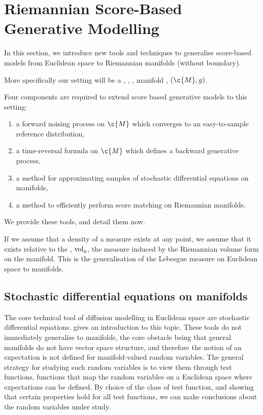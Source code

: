 \section{Riemannian Score-Based Generative Modelling}
\label{sec:score-appr-manif}
In this section, we introduce new tools and techniques to generalise score-based models from Euclidean space to Riemannian manifolds (without boundary).

More specifically our setting will be a , , ,  manifold , \((\c{M}, g)\).

Four components are required to extend score based generative models to this setting: \begin{enumerate}[label=\roman*)] \item a forward {noising} process on \(\c{M}\) which converges to an easy-to-sample reference distribution, \item a time-reversal formula on \(\c{M}\) which defines a backward generative process, \item a method for approximating samples of stochastic differential equations on manifolds, \item a method to efficiently perform score matching on Riemannian manifolds.
\end{enumerate}
We provide these tools, and detail them now.

If we assume that a density of a measure exists at any point, we assume that it exists relative to the , \(\operatorname{vol}_g\), the measure induced by the Riemannian volume form on the manifold.
This is the generalisation of the Lebesgue measure on Euclidean space to manifolds.

\subsection{Stochastic differential equations on manifolds}

The core technical tool of diffusion modelling in Euclidean space are stochastic differential equations.
 gives an introduction to this topic.
These tools do not immediately generalise to manifolds, the core obstacle being that general manifolds do not have vector space structure, and therefore the notion of an expectation is not defined for manifold-valued random variables.
The general strategy for studying such random variables is to view them through test functions, functions that map the random variables on a Euclidean space where expectations can be defined.
By choice of the class of test function, and showing that certain properties hold for all test functions, we can make conclusions about the random variables under study.

